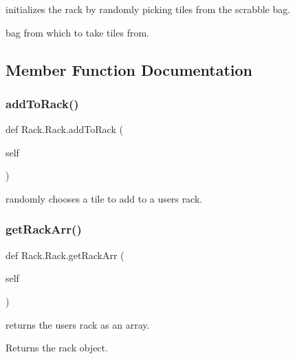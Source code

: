 initializes the rack by randomly picking tiles from the scrabble bag. 

bag from which to take tiles from. 

\subsection{Member Function Documentation}
\mbox{\label{class_rack_1_1_rack_ae0060496cb23bf03ec4dad788fb8a537}} 
\subsubsection{\texorpdfstring{add\+To\+Rack()}{addToRack()}}
{\footnotesize\ttfamily def Rack.\+Rack.\+add\+To\+Rack (\begin{DoxyParamCaption}\item[{}]{self }\end{DoxyParamCaption})}



randomly chooses a tile to add to a users rack. 

\mbox{\label{class_rack_1_1_rack_a274661a79d56e201ea873238894180e8}} 
\subsubsection{\texorpdfstring{get\+Rack\+Arr()}{getRackArr()}}
{\footnotesize\ttfamily def Rack.\+Rack.\+get\+Rack\+Arr (\begin{DoxyParamCaption}\item[{}]{self }\end{DoxyParamCaption})}



returns the users rack as an array. 

\begin{DoxyReturn}{Returns}
the rack object. 
\end{DoxyReturn}
\mbox{\label{class_rack_1_1_rack_af4100c91dbee6c72572c6fbbf95c13ac}} 
